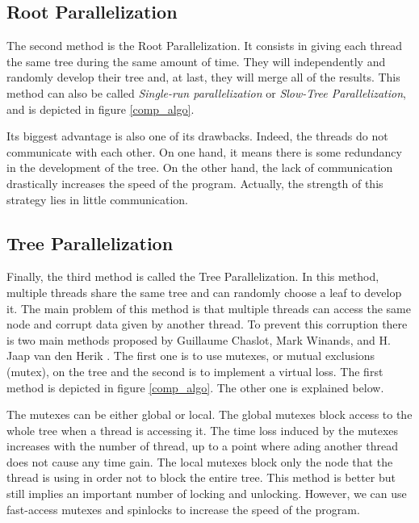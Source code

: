 \subsection{Root Parallelization}
\label{sec:root}

The second method is the Root Parallelization. It consists in giving each thread the same tree during the same amount of time. They will independently and randomly develop their tree and, at last, they will merge all of the results. This method can also be called \emph{Single-run parallelization} or \emph{Slow-Tree Parallelization}, and is depicted in figure \ref{comp_algo}.
\newline

Its biggest advantage is also one of its drawbacks. Indeed, the threads do not communicate with each other. On one hand, it means there is some redundancy in the development of the tree. On the other hand, the lack of communication drastically increases the speed of the program. Actually, the strength of this strategy lies in little communication.

\subsection{Tree Parallelization}
\label{sec:tree}

Finally, the third method is called the Tree Parallelization. In this method, multiple threads share the same tree and can randomly choose a leaf to develop it. The main problem of this method is that multiple threads can access the same node and corrupt data given by another thread. To prevent this corruption there is two main methods proposed by Guillaume Chaslot, Mark Winands, and H. Jaap van den Herik \cite{parallel_comp}. The first one is to use mutexes, or mutual exclusions (mutex), on the tree and the second is to implement a virtual loss. The first method is depicted in figure \ref{comp_algo}. The other one is explained below.
\newline

The mutexes can be either global or local. The global mutexes block access to the whole tree when a thread is accessing it. The time loss induced by the mutexes increases with the number of thread, up to a point where ading another thread does not cause any time gain. The local mutexes block only the node that the thread is using in order not to block the entire tree. This method is better but still implies an important number of locking and unlocking. However, we can use fast-access mutexes and spinlocks to increase the speed of the program.
\newline

